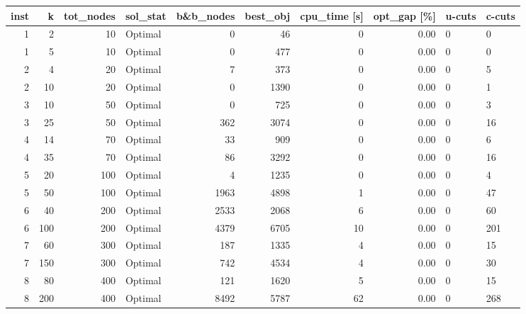 \documentclass[11pt]{article}
\begin{document}
\begin{tabular}{rrrlrrrrll}
\toprule
 inst &     k &  tot\_nodes &  sol\_stat &  b\&b\_nodes &  best\_obj &  cpu\_time [s] &  opt\_gap [\%] & u-cuts & c-cuts \\
\midrule
    1 &     2 &         10 &   Optimal &          0 &        46 &             0 &         0.00 &      0 &      0 \\
    1 &     5 &         10 &   Optimal &          0 &       477 &             0 &         0.00 &      0 &      0 \\
    2 &     4 &         20 &   Optimal &          7 &       373 &             0 &         0.00 &      0 &      5 \\
    2 &    10 &         20 &   Optimal &          0 &      1390 &             0 &         0.00 &      0 &      1 \\
    3 &    10 &         50 &   Optimal &          0 &       725 &             0 &         0.00 &      0 &      3 \\
    3 &    25 &         50 &   Optimal &        362 &      3074 &             0 &         0.00 &      0 &     16 \\
    4 &    14 &         70 &   Optimal &         33 &       909 &             0 &         0.00 &      0 &      6 \\
    4 &    35 &         70 &   Optimal &         86 &      3292 &             0 &         0.00 &      0 &     16 \\
    5 &    20 &        100 &   Optimal &          4 &      1235 &             0 &         0.00 &      0 &      4 \\
    5 &    50 &        100 &   Optimal &       1963 &      4898 &             1 &         0.00 &      0 &     47 \\
    6 &    40 &        200 &   Optimal &       2533 &      2068 &             6 &         0.00 &      0 &     60 \\
    6 &   100 &        200 &   Optimal &       4379 &      6705 &            10 &         0.00 &      0 &    201 \\
    7 &    60 &        300 &   Optimal &        187 &      1335 &             4 &         0.00 &      0 &     15 \\
    7 &   150 &        300 &   Optimal &        742 &      4534 &             4 &         0.00 &      0 &     30 \\
    8 &    80 &        400 &   Optimal &        121 &      1620 &             5 &         0.00 &      0 &     15 \\
    8 &   200 &        400 &   Optimal &       8492 &      5787 &            62 &         0.00 &      0 &    268 \\

\end{tabular}
\end{document}
